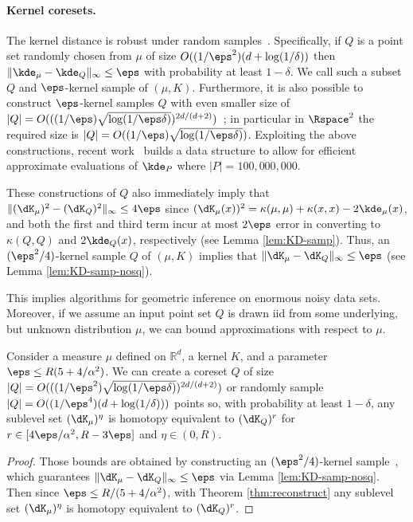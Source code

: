 \documentclass[11pt]{myclass}
\begin{document}
\paragraph{Kernel coresets.}
The kernel distance is robust under random samples~\cite{JoshiKommarajuPhillips2011}.  
Specifically, if $Q$ is a point set randomly chosen from $\mu$ of 
size $O((1/\eps^2) (d + \log(1/\delta))$ then 
$\| \kde_\mu - \kde_Q \|_{\infty} \leq \eps$
with probability at least $1-\delta$.  We call such a subset $Q$ and $\eps$-kernel sample of $(\mu, K)$.  
Furthermore, it is also possible to construct $\eps$-kernel samples $Q$ with even smaller size of $|Q| = O(((1/\eps) \sqrt{\log (1/\eps \delta)})^{2d/(d+2)})$~\cite{Phillips2013}; in particular in $\Rspace^2$ the required size is $|Q| = O((1/\eps) \sqrt{\log(1/\eps \delta)})$.  
Exploiting the above constructions, recent work~\cite{big-kde} builds a data structure to allow for efficient approximate evaluations of $\kde_P$ where $|P| = 100{,}000{,}000$.  

These constructions of $Q$ also immediately imply that $\|(\dK_\mu)^2 - (\dK_Q)^2\|_\infty \leq 4\eps$ since $(\dK_\mu(x))^2 = \kappa(\mu,\mu) + \kappa(x,x) - 2\kde_\mu(x)$, and both the first and third term incur at most $2 \eps$ error in converting to $\kappa(Q,Q)$ and $2\kde_Q(x)$, respectively (see Lemma \ref{lem:KD-samp}).  
Thus, an $(\eps^2/4)$-kernel sample $Q$ of $(\mu,K)$ implies that $\|\dK_\mu - \dK_Q\|_\infty \leq \eps$ (see Lemma \ref{lem:KD-samp-nosq}).

This implies algorithms for geometric inference on enormous noisy data sets.  
Moreover, if we assume an input point set $Q$ is drawn iid from some underlying, but unknown distribution $\mu$, we can bound approximations with respect to $\mu$.  


\begin{corollary}
Consider a measure $\mu$ defined on $\mathbb{R}^d$, a kernel $K$, and a parameter $\eps \leq R(5 + 4/\alpha^2)$.  
We can create a coreset $Q$ of size $|Q| = O(((1/\eps^2) \sqrt{\log (1/\eps \delta)})^{2d/(d+2)})$ or randomly sample $|Q| = O((1/\eps^4)(d + \log(1/\delta)))$ points so, with probability at least $1-\delta$, any sublevel set $(\dK_\mu)^\eta$ is homotopy equivalent to $(\dK_Q)^r$ for $r \in [4\eps/\alpha^2, R-3\eps]$ and $\eta \in (0, R)$.  
\end{corollary}
\begin{proof}
Those bounds are obtained by constructing an $(\eps^2/4)$-kernel sample~\cite{JoshiKommarajuPhillips2011,Phillips2013}, which guarantees $\|\dK_\mu - \dK_Q\|_\infty \leq \eps$ via Lemma \ref{lem:KD-samp-nosq}.  
Then since $\eps \leq R/(5 + 4/\alpha^2)$, with Theorem \ref{thm:reconstruct} any sublevel set $(\dK_\mu)^\eta$ is homotopy equivalent to $(\dK_Q)^r$.  
\end{proof}
\end{document}
